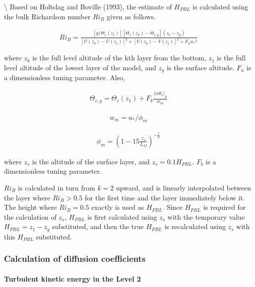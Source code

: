 \textbackslash{} Based on Holtslag and Boville (1993), the estimate of
\(H_{PBL}\) is calculated using the bulk Richardson number \(Ri_B\)
given as follows.

\begin{eqnarray}Ri_B=\frac{[g/\Theta_v(z_1)][\Theta_v(z_k)-\Theta_{v,g}](z_k-z_g)}{[U(z_k)-U(z_1)]^2+[V(z_k)-V(z_1)]^2+F_u{u_*}^2}\end{eqnarray}

where \(z_k\) is the full level altitude of the kth layer from the
bottom, \(z_1\) is the full level altitude of the lowest layer of the
model, and \(z_g\) is the surface altitude. \(F_u\) is a dimensionless
tuning parameter. Also,

\begin{eqnarray}\Theta_{v,g}=\Theta_v(z_1)+F_b \frac{\langle w\theta_v \rangle_g}{w_m}\end{eqnarray}

\begin{eqnarray}w_m=u_*/\phi_m\end{eqnarray}

\begin{eqnarray}\phi_m=\left(1-15\frac{z_s}{L_M}\right)^{-\frac{1}{3}}\end{eqnarray}

where \(z_s\) is the altitude of the surface layer, and
\(z_s=0.1H_{PBL}\). \(F_b\) is a dimensionless tuning parameter.

\(Ri_B\) is calculated in turn from \(k=2\) upward, and is linearly
interpolated between the layer where \(Ri_B>0.5\) for the first time and
the layer immediately below it. The height where \(Ri_B=0.5\) exactly is
used as \(H_{PBL}\). Since \(H_{PBL}\) is required for the calculation
of \(z_s\), \(H_{PBL}\) is first calculated using \(z_s\) with the
temporary value \(H_{PBL}=z_1-z_g\) substituted, and then the true
\(H_{PBL}\) is recalculated using \(z_s\) with this \(H_{PBL}\)
substituted.

\hypertarget{calculation-of-diffusion-coefficients}{%
\subsubsection{Calculation of diffusion
coefficients}\label{calculation-of-diffusion-coefficients}}

\hypertarget{turbulent-kinetic-energy-in-the-level-2}{%
\paragraph{Turbulent kinetic energy in the Level
2}\label{turbulent-kinetic-energy-in-the-level-2}}


